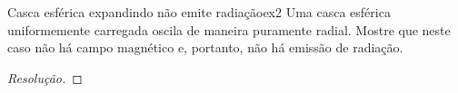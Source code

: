 \begin{exercício}{Casca esférica expandindo não emite radiação}{ex2}
    Uma casca esférica uniformemente carregada oscila de maneira puramente radial. Mostre que neste caso não há campo magnético e, portanto, não há emissão de radiação.
\end{exercício}
\begin{proof}[Resolução]
    
\end{proof}

